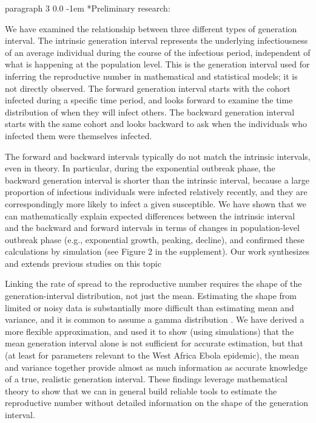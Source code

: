 \documentclass[12pt]{article}
\makeatletter
\renewcommand{\paragraph}{\vspace{0.40ex \@plus 0.2ex \@minus 0.0ex}\@startsection%
{paragraph}%
{3}%
{\parindent}%
{0.0\baselineskip}%
{-1em}%
{\normalfont\normalsize\bfseries}}%
\makeatother
\begin{document}
\paragraph*{Preliminary research:}

We have examined the relationship between three different types of generation interval. The intrinsic generation interval represents the underlying infectiousness of an average individual during the course of the infectious period, independent of what is happening at the population level. This is the generation interval used for inferring the reproductive number in mathematical and statistical models; it is not directly observed. The forward generation interval starts with the cohort infected during a specific time period, and looks forward to examine the time distribution of when they will infect others. The backward generation interval starts with the same cohort and looks backward to ask when the individuals who infected them were themselves infected.

The forward and backward intervals typically do not match the intrinsic intervals, even in theory. In particular, during the exponential outbreak phase, the backward generation interval is shorter than the intrinsic interval, because a large proportion of infectious individuals were infected relatively recently, and they are correspondingly more likely to infect a given susceptible. We have shown that we can mathematically explain expected differences between the intrinsic interval and the backward and forward intervals in terms of changes in population-level outbreak phase (e.g., exponential growth, peaking, decline), and confirmed these calculations by simulation (see Figure 2 in the supplement). Our work synthesizes and extends previous studies on this topic \cite{Svensson2007is, Kenah2008il, Tomba2010ig, Nishiura2009ct}

Linking the rate of spread to the reproductive number requires the shape of the generation-interval distribution, not just the mean. Estimating the shape from limited or noisy data is substantially more difficult than estimating mean and variance, and it is common to assume a gamma distribution \cite{Ebola2014d}. We have derived a more flexible  approximation, and used it to show (using simulations) that the mean generation interval alone is not sufficient for accurate estimation, but that (at least for parameters relevant to the West Africa Ebola epidemic), the mean and variance together provide almost as much information as accurate knowledge of a true, realistic generation interval. These findings leverage mathematical theory to show that we can in general build reliable tools to estimate the reproductive number without detailed information on the shape of the generation interval.
\end{document}
